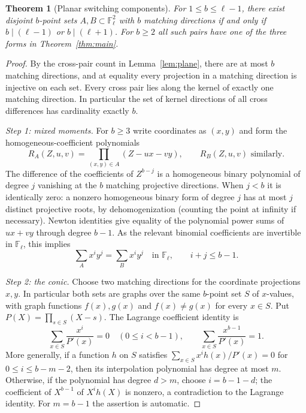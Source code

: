 \documentclass[11pt]{article}
\newtheorem{theorem}{Theorem}[section]
\theoremstyle{remark}\newtheorem{remark}[theorem]{Remark}
\newcommand{\F}{\mathbb F}
\begin{document}
\begin{theorem}[Planar switching components]\label{thm:planar}
For $1\le b\le\ell-1$, there exist disjoint $b$-point sets $A,B\subset\F_\ell^2$ with $b$ matching directions if and only if $b\mid(\ell-1)$ or $b\mid(\ell+1)$. For $b\ge2$ all such pairs have one of the three forms in Theorem~\ref{thm:main}.
\end{theorem}
\begin{proof}
By the cross-pair count in Lemma~\ref{lem:plane}, there are at most $b$ matching directions, and at equality every projection in a matching direction is injective on each set. Every cross pair lies along the kernel of exactly one matching direction. In particular the set of kernel directions of all cross differences has cardinality exactly $b$.

\emph{Step 1: mixed moments.} For $b\ge3$ write coordinates as $(x,y)$ and form the homogeneous-coefficient polynomials
\[
 R_A(Z,u,v)=\prod_{(x,y)\in A}(Z-ux-vy),\qquad R_B(Z,u,v)\text{ similarly}.
\]
The difference of the coefficients of $Z^{b-j}$ is a homogeneous binary polynomial of degree $j$ vanishing at the $b$ matching projective directions. When $j<b$ it is identically zero: a nonzero homogeneous binary form of degree $j$ has at most $j$ distinct projective roots, by dehomogenization (counting the point at infinity if necessary). Newton identities give equality of the polynomial power sums of $ux+vy$ through degree $b-1$. As the relevant binomial coefficients are invertible in $\F_\ell$, this implies
\begin{equation}\label{eq:mixed}
 \sum_A x^i y^j=\sum_B x^i y^j\quad\text{in }\F_\ell,\qquad i+j\le b-1.
\end{equation}

\emph{Step 2: the conic.} Choose two matching directions for the coordinate projections $x,y$. In particular both sets are graphs over the same $b$-point set $S$ of $x$-values, with graph functions $f(x),g(x)$ and $f(x)\ne g(x)$ for every $x\in S$. Put $P(X)=\prod_{s\in S}(X-s)$. The Lagrange coefficient identity is
\[
 \sum_{x\in S}\frac{x^i}{P'(x)}=0\quad(0\le i<b-1),\qquad
 \sum_{x\in S}\frac{x^{b-1}}{P'(x)}=1.
\]
More generally, if a function $h$ on $S$ satisfies $\sum_{x\in S}x^i h(x)/P'(x)=0$ for $0\le i\le b-m-2$, then its interpolation polynomial has degree at most $m$. Otherwise, if the polynomial has degree $d>m$, choose $i=b-1-d$; the coefficient of $X^{b-1}$ of $X^i h(X)$ is nonzero, a contradiction to the Lagrange identity. For $m=b-1$ the assertion is automatic.


\end{proof}
\end{document}
